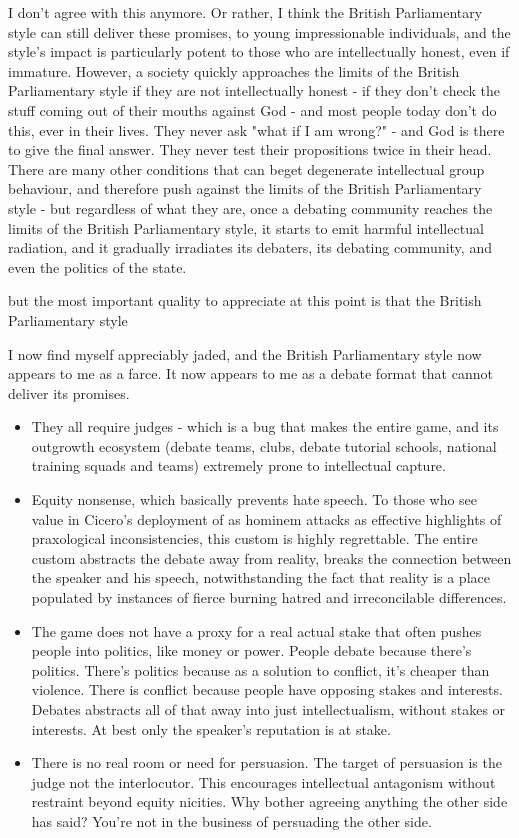 I don't agree with this anymore. Or rather, I think the British Parliamentary style can still deliver these promises, to young impressionable individuals, and the style's impact is particularly potent to those who are intellectually honest, even if immature. However, a society quickly approaches the limits of the British Parliamentary style if they are not intellectually honest - if they don't check the stuff coming out of their mouths against God - and most people today don't do this, ever in their lives. They never ask "what if I am wrong?" - and God is there to give the final answer. They never test their propositions twice in their head. There are many other conditions that can beget degenerate intellectual group behaviour, and therefore push against the limits of the British Parliamentary style - but regardless of what they are, once a debating community reaches the limits of the British Parliamentary style, it starts to emit harmful intellectual radiation, and it gradually irradiates its debaters, its debating community, and even the politics of the state.


but the most important quality to appreciate at this point is that the British Parliamentary style 




I now find myself appreciably jaded, and the British Parliamentary style now appears to me as a farce. It now appears to me as a debate format that cannot deliver its promises. 

\begin{itemize}
    \item They all require judges - which is a bug that makes the entire game, and its outgrowth ecosystem (debate teams, clubs, debate tutorial schools, national training squads and teams) extremely prone to intellectual capture.
    \item Equity nonsense, which basically prevents hate speech. To those who see value in Cicero's deployment of as hominem attacks as effective highlights of praxological inconsistencies, this custom is highly regrettable. The entire custom abstracts the debate away from reality, breaks the connection between the speaker and his speech, notwithstanding the fact that reality is a place populated by instances of fierce burning hatred and irreconcilable differences.
    \item The game does not have a proxy for a real actual stake that often pushes people into politics, like money or power. People debate because there's politics. There's politics because as a solution to conflict, it's cheaper than violence. There is conflict because people have opposing stakes and interests. Debates abstracts all of that away into just intellectualism, without stakes or interests. At best only the speaker's reputation is at stake.
    \item There is no real room or need for persuasion. The target of persuasion is the judge not the interlocutor. This encourages intellectual antagonism without restraint beyond equity nicities. Why bother agreeing anything the other side has said? You're not in the business of persuading the other side.
\end{itemize}

